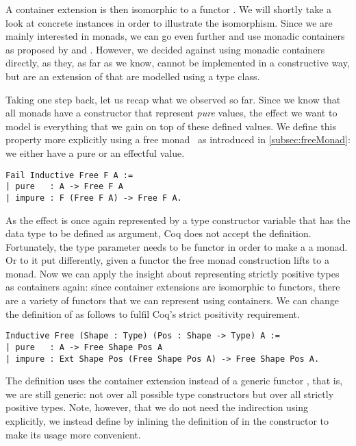 A container extension  is then isomorphic to a functor .
We will shortly take a look at concrete instances in order to illustrate the isomorphism.
Since we are mainly interested in monads, we can go even further and use monadic containers as proposed by \citet{altenkirch2017monadic} and \citet{uustalu2017partiality}.
However, we decided against using monadic containers directly, as they, as far as we know, cannot be implemented in a constructive way, but are an extension of  that are modelled using a type class.

Taking one step back, let us recap what we observed so far.
Since we know that all monads have a constructor that represent \emph{pure} values, the effect we want to model is everything that we gain on top of these defined values.
We define this property more explicitly using a free monad~\citep{swierstra2008data} as introduced in \autoref{subsec:freeMonad}: we either have a pure or an effectful value.

\begin{verbatim}
Fail Inductive Free F A :=
| pure   : A -> Free F A
| impure : F (Free F A) -> Free F A.
\end{verbatim}

As the effect is once again represented by a type constructor variable  that has the data type to be defined as argument, Coq does not accept the definition.
Fortunately, the type parameter  needs to be functor in order to make a  a monad.
Or to it put differently, given a functor  the free monad construction lifts  to a monad.
Now we can apply the insight about representing strictly positive types as containers again: since container extensions are isomorphic to functors, there are a variety of functors that we can represent using containers.
We can change the definition of  as follows to fulfil Coq's strict positivity requirement.

\begin{verbatim}
Inductive Free (Shape : Type) (Pos : Shape -> Type) A :=
| pure   : A -> Free Shape Pos A
| impure : Ext Shape Pos (Free Shape Pos A) -> Free Shape Pos A.
\end{verbatim}

The definition uses the container extension instead of a generic functor , that is, we are still generic: not over all possible type constructors but over all strictly positive types.
Note, however, that we do not need the indirection using  explicitly, we instead define  by inlining the definition of  in the constructor  to make its usage more convenient.

